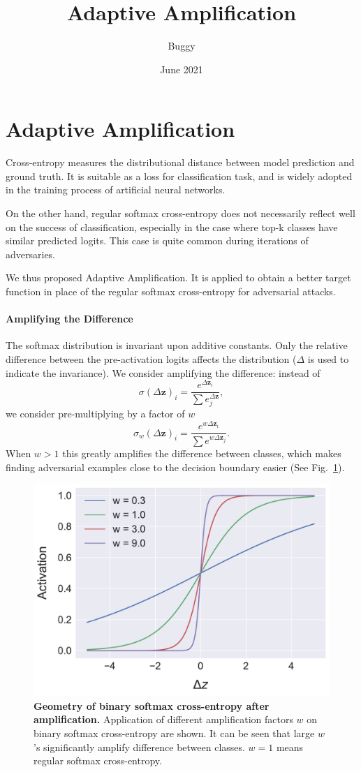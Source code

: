 \documentclass{paper}
\title{Adaptive Amplification}
\author{Buggy}
\date{June 2021}
\begin{document}
\maketitle

\section{Adaptive Amplification}
Cross-entropy measures the distributional distance between model prediction and ground truth. It is suitable as a loss for classification task, and is widely adopted in the training process of artificial neural networks.

On the other hand, regular softmax cross-entropy does not necessarily reflect well on the success of classification, especially in the case where top-k classes have similar predicted logits. This case is quite common during iterations of adversaries.

We thus proposed Adaptive Amplification. It is applied to obtain a better target function in place of the regular softmax cross-entropy for adversarial attacks.

\paragraph{Amplifying the Difference} The softmax distribution is invariant upon additive constants. Only the relative difference between the pre-activation logits affects the distribution ($\Delta$ is used to indicate the invariance). We consider amplifying the difference: instead of
\newcommand{\vdz}{\Delta \mathbf{z}}
\begin{equation}
    \sigma(\vdz)_i = \frac{e^{\vdz_i}}{\sum e^{\vdz}_j},
\end{equation}
we consider pre-multiplying by a factor of $w$
\begin{equation}
    \sigma_w(\vdz)_i = \frac{e^{w\vdz_i}}{\sum e^{w\vdz_j}}.
\end{equation}
When $w > 1$ this greatly amplifies the difference between classes, which makes finding adversarial examples close to the decision boundary easier (See Fig.\ \ref{fig:softmax_preamp}).

\begin{figure}[ht]
    \centering
    \includegraphics[width=0.5\linewidth]{bin_amp_geo.pdf}
    \caption{\textbf{Geometry of binary softmax cross-entropy after amplification.} Application of different amplification factors $w$ on binary softmax cross-entropy are shown. It can be seen that large $w$'s significantly amplify difference between classes. $w = 1$ means regular softmax cross-entropy.}
    \label{fig:softmax_preamp}
\end{figure}
\end{document}
